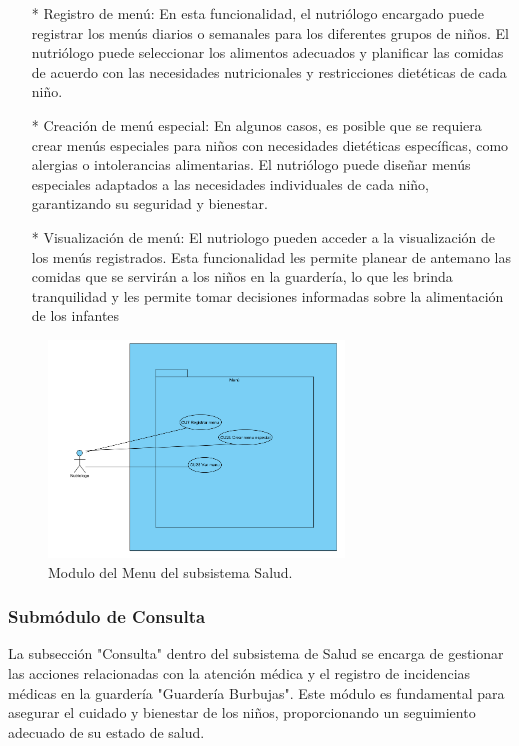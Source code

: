 \begin{itemize}
    \item[*] Registro de menú: En esta funcionalidad, el nutriólogo encargado puede registrar los menús diarios o semanales para los diferentes grupos de niños. El nutriólogo puede seleccionar los alimentos adecuados y planificar las comidas de acuerdo con las necesidades nutricionales y restricciones dietéticas de cada niño.
    \item[*] Creación de menú especial: En algunos casos, es posible que se requiera crear menús especiales para niños con necesidades dietéticas específicas, como alergias o intolerancias alimentarias. El nutriólogo puede diseñar menús especiales adaptados a las necesidades individuales de cada niño, garantizando su seguridad y bienestar.
    \item[*] Visualización de menú: El nutriologo pueden acceder a la visualización de los menús registrados. Esta funcionalidad les permite planear de antemano las comidas que se servirán a los niños en la guardería, lo que les brinda tranquilidad y les permite tomar decisiones informadas sobre la alimentación de los infantes

\end{itemize}

\begin{figure}[htbp]
\centering
\includegraphics[width=0.7\textwidth]{images/arqui/subSaludMenu.png}
\caption{Modulo del Menu del subsistema Salud.}
\label{fig:subsistsaludmenu}
\end{figure}



\subsubsection{Submódulo de Consulta}
La subsección "Consulta" dentro del subsistema de Salud se encarga de gestionar las acciones relacionadas con la atención médica y el registro de incidencias médicas en la guardería "Guardería Burbujas". Este módulo es fundamental para asegurar el cuidado y bienestar de los niños, proporcionando un seguimiento adecuado de su estado de salud.

